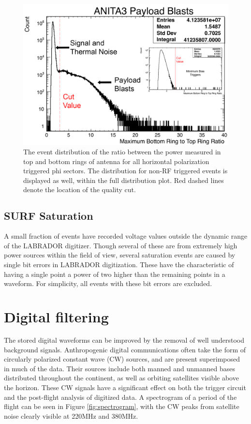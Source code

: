 \begin{figure}
	\centering
	\includegraphics[height=0.5\textheight]{figures/payloadBlastDistribution}
	\caption{The event distribution of the ratio between the power measured in top and bottom rings of antenna for all horizontal polarization triggered phi sectors.  The distribution for non-RF triggered events is displayed as well, within the full distribution plot.  Red dashed lines denote the location of the quality cut.}
	\label{fig:payloadBlastDist}
\end{figure}
	
	\subsection{SURF Saturation}
		A small fraction of events have recorded voltage values outside the dynamic range of the LABRADOR digitizer.  Though several of these are from extremely high power sources within the field of view, several saturation events are caused by single bit errors in LABRADOR digitization.  These have the characteristic of having a single point a power of two higher than the remaining points in a waveform.  For simplicity, all events with these bit errors are excluded.
		
\section{Digital filtering}
	The stored digital waveforms can be improved by the removal of well understood background signals.  Anthropogenic digital communications often take the form of circularly polarized constant wave (CW) sources, and are present superimposed in much of the data.  Their sources include both manned and unmanned bases distributed throughout the continent, as well as orbiting satellites visible above the horizon.  These CW signals have a significant effect on both the trigger circuit and the post-flight analysis of digitized data. A spectrogram of a period of the flight can be seen in Figure \ref{fig:spectrogram}, with the CW peaks from satellite noise clearly visible at 220MHz and 380MHz.

